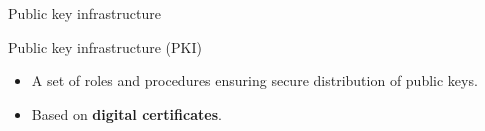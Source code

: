 \begin{frame}{Public key infrastructure}

\begin{exampleblock}{Public key infrastructure (PKI)}
\begin{itemize}
\item 
A set of roles
and procedures
ensuring
secure distribution of public keys.
\item Based on \textbf{digital certificates}.
\end{itemize}
\end{exampleblock}


%

\end{frame}

